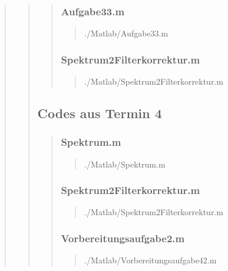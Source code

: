 \begin{quote}
\begin{quote}
\begin{quote}
        \subsubsection{Aufgabe33.m}
        \begin{quote}
            
                {./Matlab/Aufgabe33.m}
        \end{quote}
        
        \subsubsection{Spektrum2Filterkorrektur.m}
        \begin{quote}
            
                {./Matlab/Spektrum2Filterkorrektur.m}
        \end{quote}
	\end{quote}
	
	\subsection{Codes aus Termin 4}
	\begin{quote}
		
		\subsubsection{Spektrum.m}
		\begin{quote}
		
				{./Matlab/Spektrum.m}
		\end{quote}
		
		\subsubsection{Spektrum2Filterkorrektur.m}
        \begin{quote}
        
                {./Matlab/Spektrum2Filterkorrektur.m}
        \end{quote}
		
		\subsubsection{Vorbereitungsaufgabe2.m}
		\begin{quote}
		
		        {./Matlab/Vorbereitungsaufgabe42.m}
		\end{quote}
		

\end{quote}
\end{quote}
\end{quote}
